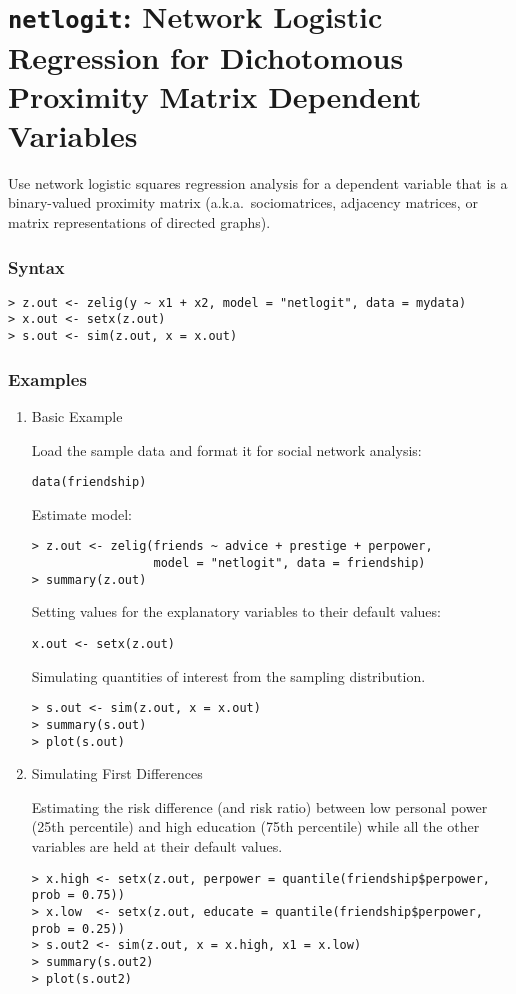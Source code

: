 \section{{\tt netlogit}: Network Logistic Regression for
Dichotomous Proximity Matrix Dependent Variables}\label{netlogit} 

Use network logistic squares regression analysis for a dependent
variable that is a binary-valued proximity matrix (a.k.a.\
sociomatrices, adjacency matrices, or matrix representations of
directed graphs).

\subsubsection{Syntax}
\begin{verbatim}
> z.out <- zelig(y ~ x1 + x2, model = "netlogit", data = mydata) 
> x.out <- setx(z.out)
> s.out <- sim(z.out, x = x.out)
\end{verbatim}

\subsubsection{Examples}
\begin{enumerate}
\item Basic Example

Load the sample data and format it for social network analysis:
\begin{verbatim} 
data(friendship)
\end{verbatim}
Estimate model:
\begin{verbatim}
> z.out <- zelig(friends ~ advice + prestige + perpower, 
                 model = "netlogit", data = friendship)
> summary(z.out)
\end{verbatim}
Setting values for the explanatory variables to their default values:
\begin{verbatim}
x.out <- setx(z.out)
\end{verbatim}
Simulating quantities of interest from the sampling distribution.
\begin{verbatim}
> s.out <- sim(z.out, x = x.out) 
> summary(s.out) 
> plot(s.out) 
\end{verbatim}

\item Simulating First Differences

Estimating the risk difference (and risk ratio) between low personal
power (25th percentile) and high education (75th percentile) while all
the other variables are held at their default values.

\begin{verbatim}
> x.high <- setx(z.out, perpower = quantile(friendship$perpower, prob = 0.75))    
> x.low  <- setx(z.out, educate = quantile(friendship$perpower, prob = 0.25))
> s.out2 <- sim(z.out, x = x.high, x1 = x.low)   
> summary(s.out2)   
> plot(s.out2)   
\end{verbatim}
\end{enumerate}

